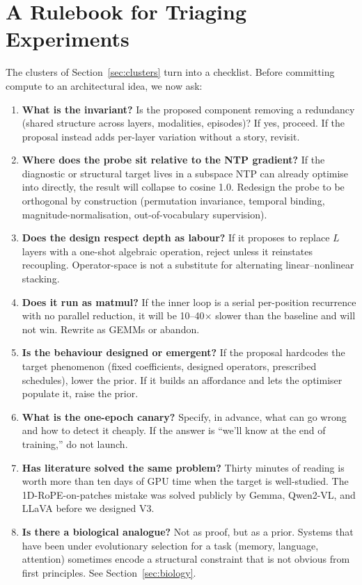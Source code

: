 \documentclass[11pt, a4paper]{article}
\begin{document}
\section{A Rulebook for Triaging Experiments}
\label{sec:rulebook}

The clusters of Section~\ref{sec:clusters} turn into a checklist. Before committing compute to an architectural idea, we now ask:

\begin{enumerate}[label=\textbf{R\arabic*.}, leftmargin=*]
\item \textbf{What is the invariant?} Is the proposed component removing a redundancy (shared structure across layers, modalities, episodes)? If yes, proceed. If the proposal instead adds per-layer variation without a story, revisit.

\item \textbf{Where does the probe sit relative to the NTP gradient?} If the diagnostic or structural target lives in a subspace NTP can already optimise into directly, the result will collapse to cosine 1.0. Redesign the probe to be orthogonal by construction (permutation invariance, temporal binding, magnitude-normalisation, out-of-vocabulary supervision).

\item \textbf{Does the design respect depth as labour?} If it proposes to replace $L$ layers with a one-shot algebraic operation, reject unless it reinstates recoupling. Operator-space is not a substitute for alternating linear--nonlinear stacking.

\item \textbf{Does it run as matmul?} If the inner loop is a serial per-position recurrence with no parallel reduction, it will be 10--40$\times$ slower than the baseline and will not win. Rewrite as GEMMs or abandon.

\item \textbf{Is the behaviour designed or emergent?} If the proposal hardcodes the target phenomenon (fixed coefficients, designed operators, prescribed schedules), lower the prior. If it builds an affordance and lets the optimiser populate it, raise the prior.

\item \textbf{What is the one-epoch canary?} Specify, in advance, what can go wrong and how to detect it cheaply. If the answer is ``we'll know at the end of training,'' do not launch.

\item \textbf{Has literature solved the same problem?} Thirty minutes of reading is worth more than ten days of GPU time when the target is well-studied. The 1D-RoPE-on-patches mistake was solved publicly by Gemma, Qwen2-VL, and LLaVA before we designed V3.

\item \textbf{Is there a biological analogue?} Not as proof, but as a prior. Systems that have been under evolutionary selection for a task (memory, language, attention) sometimes encode a structural constraint that is not obvious from first principles. See Section~\ref{sec:biology}.
\end{enumerate}
\end{document}
